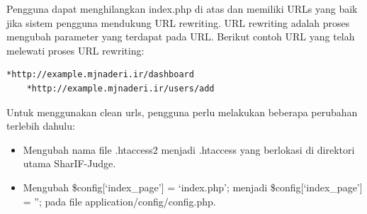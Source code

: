 Pengguna dapat menghilangkan index.php di atas dan memiliki URLs yang baik jika sistem pengguna mendukung URL rewriting. URL rewriting adalah proses mengubah parameter yang terdapat pada URL. Berikut contoh URL yang telah melewati proses URL rewriting:
 \begin{lstlisting}[basicstyle=\ttfamily, frame=single,
    columns=fullflexible, breaklines=true, numbers=none]
    *http://example.mjnaderi.ir/dashboard
    *http://example.mjnaderi.ir/users/add
    \end{lstlisting}
Untuk menggunakan clean urls, pengguna perlu melakukan beberapa perubahan terlebih dahulu:
\begin{itemize}
    \item Mengubah nama file .htaccess2 menjadi .htaccess yang berlokasi di direktori utama SharIF-Judge.
    \item Mengubah \$config[`index\_page'] = `index.php'; menjadi \$config[`index\_page'] = ”; pada file application/config/config.php.
\end{itemize}

